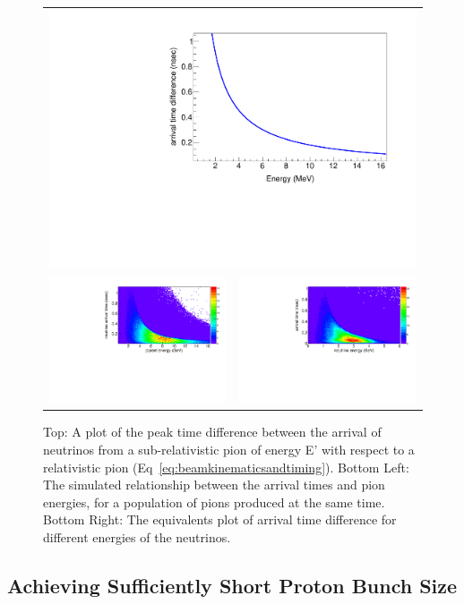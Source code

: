\begin{figure}[h]
	\begin{center}
           	\begin{tabular}{c c}
 \multicolumn{2}{c}{\includegraphics[width=0.5\linewidth]{Figures/deltaTvsE.pdf}} \\
 \includegraphics[width=0.49\linewidth]{Figures/parentEvsdT.pdf} &
 \includegraphics[width=0.49\linewidth]{Figures/nuEvsdT.pdf} \\
			\end{tabular}
	\end{center}
	\caption{Top: A plot of the peak time difference between the arrival of neutrinos from a sub-relativistic pion of energy E' with respect to a relativistic pion (Eq~\ref{eq:beamkinematicsandtiming}). Bottom Left: The simulated relationship between the arrival times and pion energies, for a population of pions produced at the same time. Bottom Right: The equivalents plot of arrival time difference for different energies of the neutrinos.}
		\label{fig:beamkinematicsandtiming}
\end{figure}


\subsection{Achieving Sufficiently Short Proton Bunch Size}
\label{spectra}


